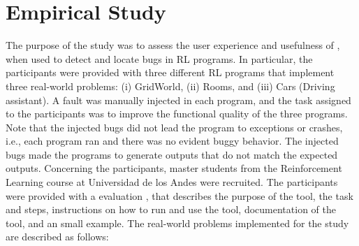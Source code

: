 
\section{Empirical Study}
\label{sec:evaluation}

The purpose of the study was to assess the user experience and usefulness of \flik, when used to detect and locate bugs in  \ac{RL} programs. In particular, the participants were provided with three different RL programs that implement three real-world problems:  (i) GridWorld, (ii) Rooms, and (iii) Cars (Driving assistant). A fault was manually injected in each program, and the task assigned to the participants was to improve the functional quality of the three programs. Note that the injected bugs did not lead the program to exceptions or crashes, i.e., each program ran and there was no evident buggy behavior. The injected bugs made the programs to generate outputs that do not match the expected outputs. Concerning the participants, master students from the Reinforcement Learning course at Universidad de los Andes were recruited.  The participants were provided with a evaluation  , that describes the purpose of the tool, the task and steps, instructions on how to run and 
use the tool, documentation of the tool, and an small example. The real-world problems implemented for the study are described as follows:





